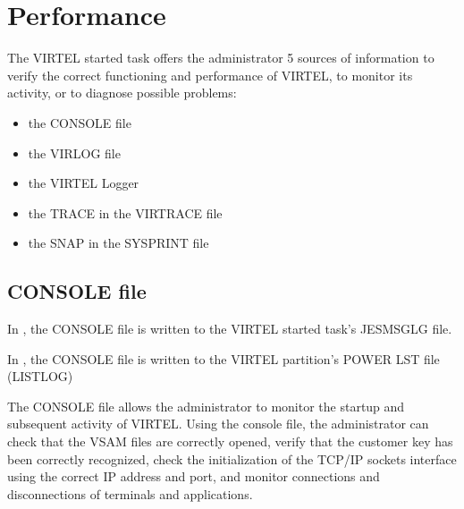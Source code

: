 \documentclass[letterpaper,10pt,english]{sphinxmanual}
\begin{document}
\chapter{Performance}
\label{\detokenize{audit_operations_ and_performance:performance}}\label{\detokenize{audit_operations_ and_performance:index-73}}
\sphinxAtStartPar
The VIRTEL started task offers the administrator 5 sources of information to verify the correct functioning and performance of VIRTEL, to monitor its activity, or to diagnose possible problems:
\begin{itemize}
\item {} 
\sphinxAtStartPar
the CONSOLE file

\item {} 
\sphinxAtStartPar
the VIRLOG file

\item {} 
\sphinxAtStartPar
the VIRTEL Logger

\item {} 
\sphinxAtStartPar
the TRACE in the VIRTRACE file

\item {} 
\sphinxAtStartPar
the SNAP in the SYSPRINT file

\end{itemize}

\ignorespaces 

\section{CONSOLE file}
\label{\detokenize{audit_operations_ and_performance:console-file}}\label{\detokenize{audit_operations_ and_performance:index-74}}
\sphinxAtStartPar
In , the CONSOLE file is written to the VIRTEL started task’s JESMSGLG file.

\sphinxAtStartPar
In , the CONSOLE file is written to the VIRTEL partition’s POWER LST file (LISTLOG)

\sphinxAtStartPar
The CONSOLE file allows the administrator to monitor the startup and subsequent activity of VIRTEL. Using the console file, the administrator can check that the VSAM files are correctly opened, verify that the customer key has been correctly recognized, check the initialization of the TCP/IP sockets interface using the correct IP address and port, and monitor connections and disconnections of terminals and applications.
\end{document}
